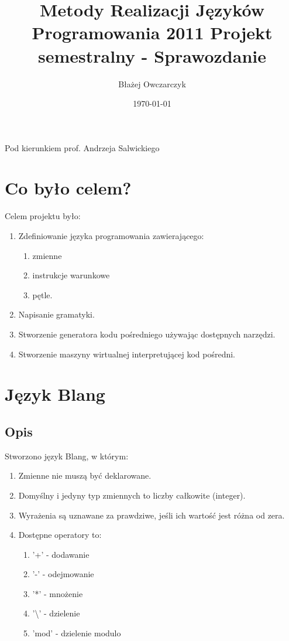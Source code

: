 \documentclass[a4paper,10pt]{article}
\title{Metody Realizacji Języków Programowania 2011 \newline Projekt semestralny - Sprawozdanie}
\author{Błażej Owczarczyk}
\date{\today}
\begin{document}
\maketitle
 \begin{center} 
  Pod kierunkiem prof. Andrzeja Salwickiego
 \end{center}
\newpage

\tableofcontents
\newpage

\section{Co było celem?}
Celem projektu było:
\begin{enumerate}
 \item Zdefiniowanie języka programowania zawierającego:
 \begin{enumerate}
  \item zmienne
  \item instrukcje warunkowe
  \item pętle.
 \end{enumerate}
 \item Napisanie gramatyki.
 \item Stworzenie generatora kodu pośredniego używając dostępnych narzędzi.
 \item Stworzenie maszyny wirtualnej interpretującej kod pośredni.
\end{enumerate}

\newpage

\section{Język Blang}

\subsection{Opis}
Stworzono język Blang, w którym:
\begin{enumerate}
 \item Zmienne nie muszą być deklarowane.
 \item Domyślny i jedyny typ zmiennych to liczby całkowite (integer).
 \item Wyrażenia są uznawane za prawdziwe, jeśli ich wartość jest różna od zera.
 \item Dostępne operatory to:
 \begin{enumerate}
  \item '+' - dodawanie
  \item '-' - odejmowanie
  \item '*' - mnożenie
  \item '\textbackslash' - dzielenie
  \item 'mod' - dzielenie modulo
 \end{enumerate}
\end{enumerate}
\end{document}
